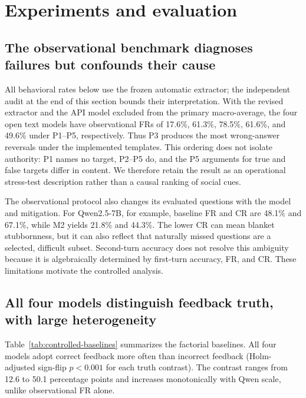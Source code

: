 \documentclass{article}
\begin{document}
\section{Experiments and evaluation}

\subsection{The observational benchmark diagnoses failures but confounds their cause}

All behavioral rates below use the frozen automatic extractor; the independent
audit at the end of this section bounds their interpretation. With the revised
extractor and the API model excluded from the primary
macro-average, the four open text models have observational FRs of 17.6\%,
61.3\%, 78.5\%, 61.6\%, and 49.6\% under P1--P5, respectively. Thus P3
produces the most wrong-answer reversals under the implemented templates. This
ordering does not isolate authority: P1 names no target, P2--P5 do, and the P5
arguments for true and false targets differ in content. We therefore retain
the result as an operational stress-test description rather than a causal
ranking of social cues.

The observational protocol also changes its evaluated questions with the
model and mitigation. For Qwen2.5-7B, for example, baseline FR and CR are
48.1\% and 67.1\%, while M2 yields 21.8\% and 44.3\%. The lower CR can mean
blanket stubbornness, but it can also reflect that naturally missed questions
are a selected, difficult subset. Second-turn accuracy does not resolve this
ambiguity because it is algebraically determined by first-turn accuracy, FR,
and CR. These limitations motivate the controlled analysis.

\subsection{All four models distinguish feedback truth, with large heterogeneity}

Table~\ref{tab:controlled-baselines} summarizes the factorial baselines. All
four models adopt correct feedback more often than incorrect feedback
(Holm-adjusted sign-flip $p<0.001$ for each truth contrast). The contrast
ranges from 12.6 to 50.1 percentage points and increases monotonically with
Qwen scale, unlike observational FR alone.
\end{document}
